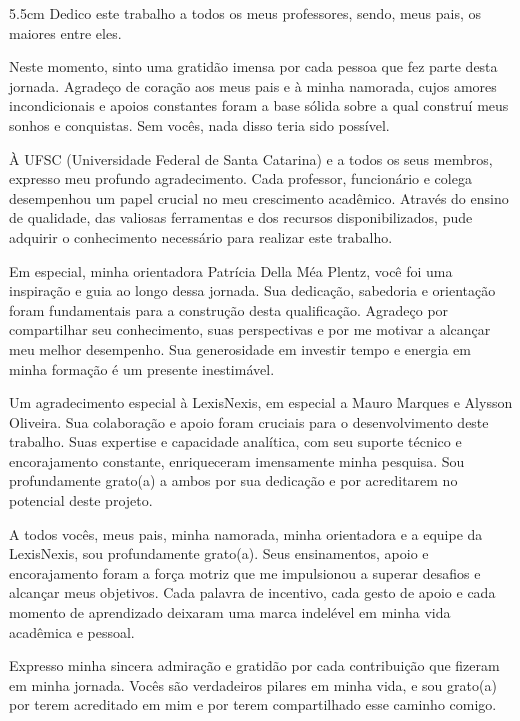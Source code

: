 \begin{dedicatoria}
	\vspace*{\fill}
	\noindent
	\begin{adjustwidth*}{}{5.5cm} 
		\raggedleft       
		Dedico este trabalho a todos os meus professores, 
sendo, meus pais, os maiores entre eles.
	\end{adjustwidth*}
\end{dedicatoria}

\begin{agradecimentos}
    Neste momento, sinto uma gratidão imensa por cada pessoa que fez parte desta jornada. Agradeço de coração aos meus pais e à minha namorada, cujos amores incondicionais e apoios constantes foram a base sólida sobre a qual construí meus sonhos e conquistas. Sem vocês, nada disso teria sido possível.

    À UFSC (Universidade Federal de Santa Catarina) e a todos os seus membros, expresso meu profundo agradecimento. Cada professor, funcionário e colega desempenhou um papel crucial no meu crescimento acadêmico. Através do ensino de qualidade, das valiosas ferramentas e dos recursos disponibilizados, pude adquirir o conhecimento necessário para realizar este trabalho.

    Em especial, minha orientadora Patrícia Della Méa Plentz, você foi uma inspiração e guia ao longo dessa jornada. Sua dedicação, sabedoria e orientação foram fundamentais para a construção desta qualificação. Agradeço por compartilhar seu conhecimento, suas perspectivas e por me motivar a alcançar meu melhor desempenho. Sua generosidade em investir tempo e energia em minha formação é um presente inestimável.

    Um agradecimento especial à LexisNexis, em especial a Mauro Marques e Alysson Oliveira. Sua colaboração e apoio foram cruciais para o desenvolvimento deste trabalho. Suas expertise e capacidade analítica, com seu suporte técnico e encorajamento constante, enriqueceram imensamente minha pesquisa. Sou profundamente grato(a) a ambos por sua dedicação e por acreditarem no potencial deste projeto.


    A todos vocês, meus pais, minha namorada, minha orientadora e a equipe da LexisNexis, sou profundamente grato(a). Seus ensinamentos, apoio e encorajamento foram a força motriz que me impulsionou a superar desafios e alcançar meus objetivos. Cada palavra de incentivo, cada gesto de apoio e cada momento de aprendizado deixaram uma marca indelével em minha vida acadêmica e pessoal.

    Expresso minha sincera admiração e gratidão por cada contribuição que fizeram em minha jornada. Vocês são verdadeiros pilares em minha vida, e sou grato(a) por terem acreditado em mim e por terem compartilhado esse caminho comigo.

\end{agradecimentos}

